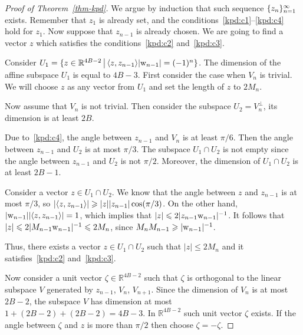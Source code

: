 \documentclass[12pt,oneside,a4paper]{amsart}
\begin{document}
\begin{proof}[Proof of Theorem~\ref{thm-kpd}]
        We argue by induction that such sequence $\{{z}_n\}_{n=1}^\infty$ exists.
        Remember that $z_1$ is already set, and the conditions~\ref{kpd:c1}--\ref{kpd:c4} hold for $z_1$.
        Now suppose that $z_{n - 1}$ is already chosen.
        We are going to find a vector $z$ which satisfies the conditions~\ref{kpd:c2} and~\ref{kpd:c3}.

        Consider $U_1 = \{z \in \mathbb{R}^{4B-2}\, \big| \, \langle z, z_{n-1} \rangle\lvert\mathrm{w}_{n-1}\rvert  = (-1)^{n}\}$.
        The dimension of the affine subspace $U_1$ is equal to $4B - 3$.
        First consider the case when $V_n$ is trivial. We will choose $z$ as any vector from $U_1$
          and set the length of $z$ to $2 M_n$.

        Now assume that $V_n$ is not trivial.
        Then consider the subspace $U_2 = V_n^\bot$, its dimension is at least $2B$.

        Due to~\ref{kpd:c4}, the angle between $z_{n - 1}$ and $V_n$ is at least $\pi / 6$.
        Then the angle between $z_{n - 1}$ and $U_2$ is at most $\pi / 3$.
        The subspace $U_1 \cap U_2$ is not empty since the angle between $z_{n-1}$ and $U_2$ is not $\pi / 2$.
        Moreover, the dimension of $U_1 \cap U_2$ is at least $2B - 1$.

        Consider a vector $z \in U_1 \cap U_2$.
        We know that the angle between $z$ and $z_{n-1}$ is at most $\pi / 3$,
          so $\lvert \langle z, z_{n-1} \rangle \rvert \geqslant \lvert z \rvert \lvert z_{n-1}\rvert  \cos(\pi / 3)$.
        On the other hand, $\lvert\mathrm{w}_{n-1}\rvert \lvert \langle z, z_{n-1} \rangle \rvert = 1$, which implies
          that $\lvert z\rvert \leqslant 2 \lvert z_{n-1} \mathrm{w}_{n-1}\rvert^{-1}$.
        It follows that $\lvert z\rvert \leqslant 2 \lvert  M_{n-1} \mathrm{w}_{n-1}\rvert^{-1}
          \leqslant 2 M_n$, since $M_n M_{n-1} \geqslant \lvert \mathrm{w}_{n-1} \rvert^{-1}$.

        Thus, there exists a vector $z \in U_1 \cap U_2$ such that $\lvert z\rvert \leq 2 M_n$ and
          it satisfies~\ref{kpd:c2} and~\ref{kpd:c3}.

        Now consider a unit vector $\zeta \in \mathbb{R}^{4B - 2}$
          such that $\zeta$ is orthogonal to the linear subspace $V$ generated by
          $z_{n-1}$, $V_{n}$, $V_{n + 1}$.
        Since the dimension of $V_n$ is at most $2B - 2$,
          the subspace $V$ has dimension at most $1 + (2B - 2) + (2B - 2) = 4B - 3$.
        In $\mathbb{R}^{4B - 2}$ such unit vector $\zeta$ exists.
        If the angle between $\zeta$ and $z$ is more than $\pi/2$ then choose $\zeta = -\zeta$.


\end{proof}
\end{document}
